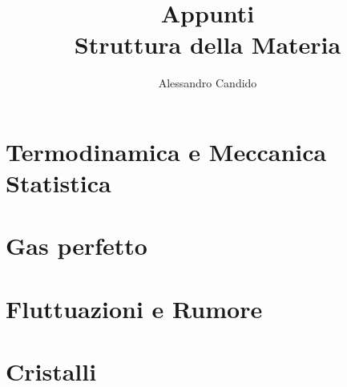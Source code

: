 \documentclass[a4paper,10pt]{book}
\title{Appunti \\
		\Large Struttura della Materia}
\author{Alessandro Candido}
\begin{document}
\frontmatter
\maketitle



\mainmatter
\chapter{Termodinamica e Meccanica Statistica}



\chapter{Gas perfetto}

\chapter{Fluttuazioni e Rumore}

\chapter{Cristalli}

\appendix
\end{document}
